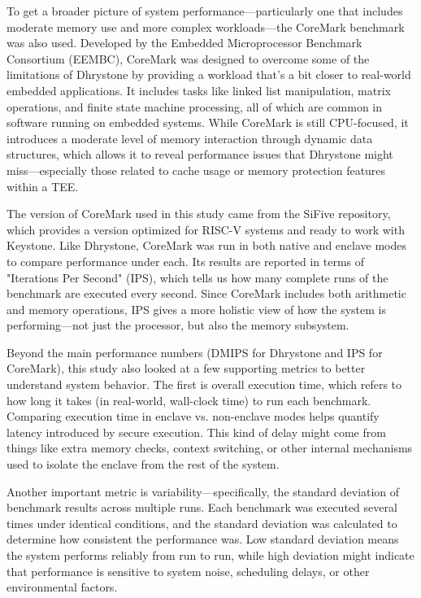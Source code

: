 To get a broader picture of system performance—particularly one that includes moderate memory use and more complex workloads—the CoreMark benchmark was also used. Developed by the Embedded Microprocessor Benchmark Consortium (EEMBC), CoreMark was designed to overcome some of the limitations of Dhrystone by providing a workload that’s a bit closer to real-world embedded applications. It includes tasks like linked list manipulation, matrix operations, and finite state machine processing, all of which are common in software running on embedded systems. While CoreMark is still CPU-focused, it introduces a moderate level of memory interaction through dynamic data structures, which allows it to reveal performance issues that Dhrystone might miss—especially those related to cache usage or memory protection features within a TEE.

The version of CoreMark used in this study came from the SiFive repository, which provides a version optimized for RISC-V systems and ready to work with Keystone. Like Dhrystone, CoreMark was run in both native and enclave modes to compare performance under each. Its results are reported in terms of "Iterations Per Second" (IPS), which tells us how many complete runs of the benchmark are executed every second. Since CoreMark includes both arithmetic and memory operations, IPS gives a more holistic view of how the system is performing—not just the processor, but also the memory subsystem.

Beyond the main performance numbers (DMIPS for Dhrystone and IPS for CoreMark), this study also looked at a few supporting metrics to better understand system behavior. The first is overall execution time, which refers to how long it takes (in real-world, wall-clock time) to run each benchmark. Comparing execution time in enclave vs. non-enclave modes helps quantify latency introduced by secure execution. This kind of delay might come from things like extra memory checks, context switching, or other internal mechanisms used to isolate the enclave from the rest of the system.

Another important metric is variability—specifically, the standard deviation of benchmark results across multiple runs. Each benchmark was executed several times under identical conditions, and the standard deviation was calculated to determine how consistent the performance was. Low standard deviation means the system performs reliably from run to run, while high deviation might indicate that performance is sensitive to system noise, scheduling delays, or other environmental factors.

